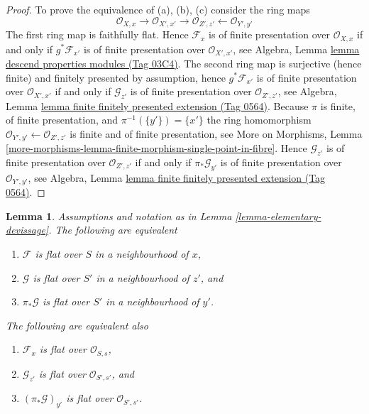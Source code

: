 \documentclass{amsart}
\theoremstyle{plain}
\newtheorem{lemma}[subsection]{Lemma}
\theoremstyle{definition}
\theoremstyle{remark}
\numberwithin{equation}{subsection}
\begin{document}
\begin{proof}
\medskip\noindent
To prove the equivalence of (a), (b), (c) consider the ring maps
$$
\mathcal{O}_{X, x} \to
\mathcal{O}_{X', x'} \to
\mathcal{O}_{Z', z'} \leftarrow
\mathcal{O}_{Y', y'}
$$
The first ring map is faithfully flat. Hence
$\mathcal{F}_x$ is of finite presentation over $\mathcal{O}_{X, x}$
if and only if $g^*\mathcal{F}_{x'}$ is of finite presentation over
$\mathcal{O}_{X', x'}$, see
Algebra, Lemma \href{https://stacks.math.columbia.edu/tag/03C4}{lemma descend properties modules (Tag 03C4)}.
The second ring map is surjective (hence finite) and
finitely presented by assumption, hence
$g^*\mathcal{F}_{x'}$ is of finite presentation over $\mathcal{O}_{X', x'}$
if and only if $\mathcal{G}_{z'}$ is of finite presentation over
$\mathcal{O}_{Z', z'}$, see
Algebra, Lemma \href{https://stacks.math.columbia.edu/tag/0564}{lemma finite finitely presented extension (Tag 0564)}.
Because $\pi$ is finite, of finite presentation, and
$\pi^{-1}(\{y'\}) = \{x'\}$ the ring homomorphism
$\mathcal{O}_{Y', y'} \leftarrow \mathcal{O}_{Z', z'}$ is finite
and of finite presentation, see
More on Morphisms,
Lemma \ref{more-morphisms-lemma-finite-morphism-single-point-in-fibre}.
Hence $\mathcal{G}_{z'}$ is of finite presentation over $\mathcal{O}_{Z', z'}$
if and only if $\pi_*\mathcal{G}_{y'}$ is of finite presentation over
$\mathcal{O}_{Y', y'}$, see
Algebra, Lemma \href{https://stacks.math.columbia.edu/tag/0564}{lemma finite finitely presented extension (Tag 0564)}.
\end{proof}


\begin{lemma}
\label{lemma-devissage-flat}
Assumptions and notation as in
Lemma \ref{lemma-elementary-devissage}.
The following are equivalent
\begin{enumerate}
\item $\mathcal{F}$ is flat over $S$ in a neighbourhood of $x$,
\item $\mathcal{G}$ is flat over $S'$ in a neighbourhood of $z'$, and
\item $\pi_*\mathcal{G}$ is flat over $S'$ in a neighbourhood of $y'$.
\end{enumerate}
The following are equivalent also
\begin{enumerate}
\item[(a)] $\mathcal{F}_x$ is flat over $\mathcal{O}_{S, s}$,
\item[(b)] $\mathcal{G}_{z'}$ is flat over $\mathcal{O}_{S', s'}$, and
\item[(c)] $(\pi_*\mathcal{G})_{y'}$ is flat over $\mathcal{O}_{S', s'}$.
\end{enumerate}
\end{lemma}
\end{document}
